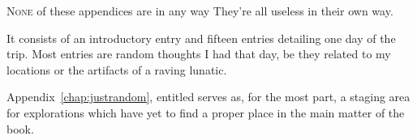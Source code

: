 \documentclass[../butidigress.tex]{subfiles}
\begin{document}
\lettrine{N}{one} of these appendices are in any way 
They're all useless in their own way.

It consists of an introductory entry and fifteen entries detailing one day of the trip.
Most entries are random thoughts I had that day, be they related to my locations or the artifacts of a raving lunatic.

Appendix~\ref{chap:justrandom}, entitled  serves as, for the most part, a staging area for explorations which have yet to find a proper place in the main matter of the book.

% 












\end{document}

